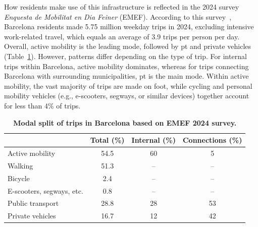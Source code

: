 How residents make use of this infrastructure is reflected in the 2024 survey \textit{Enquesta de Mobilitat en Dia Feiner} (EMEF). According to this survey~\cite{EMEF2024}, Barcelona residents made 5.75 million weekday trips in 2024, excluding intensive work-related travel, which equals an average of 3.9 trips per person per day. Overall, active mobility is the leading mode, followed by \ac{pt} and private vehicles (Table~\ref{tab:modal_split}). However, patterns differ depending on the type of trip. For internal trips within Barcelona, active mobility dominates, whereas for trips connecting Barcelona with surrounding municipalities, \ac{pt} is the main mode. Within active mobility, the vast majority of trips are made on foot, while cycling and personal mobility vehicles (e.g., e-scooters, segways, or similar devices) together account for less than 4\% of trips.

\begin{table}[!htbp]
    \centering
    \caption[Modal split of trips in Barcelona based on EMEF 2024 survey]{
        \textbf{Modal split of trips in Barcelona based on EMEF 2024 survey.}
    }
    \label{tab:modal_split}
    \begin{tabular}{lccc}
        \hline
        & \textbf{Total (\%)} & \textbf{Internal (\%)} & \textbf{Connections (\%)} \\
        \hline
        Active mobility & 54.5 & 60 & 5 \\
        \quad Walking & 51.3 & -- & -- \\
        \quad Bicycle & 2.4 & -- & -- \\
        \quad E-scooters, segways, etc. & 0.8 & -- & -- \\
        Public transport & 28.8 & 28 & 53 \\
        Private vehicles & 16.7 & 12 & 42 \\
        \hline
    \end{tabular}
\end{table}

